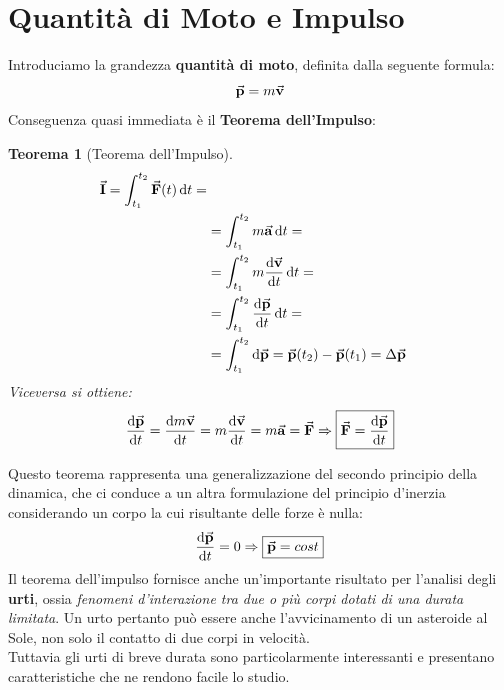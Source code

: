 \documentclass{report}
\newtheorem{thm}{Teorema}[section]
\newcommand{\then}{\ensuremath{\Rightarrow}}
\renewcommand{\a}{\va{a}}
\renewcommand{\v}{\va{v}}
\newcommand{\F}{\va{F}}
\newcommand{\p}{\va{p}}
\begin{document}
\section{Quantità di Moto e Impulso}
Introduciamo la grandezza \textbf{quantità di moto}, definita dalla seguente formula:
\begin{equation}
    \p=m\v
\end{equation}
Conseguenza quasi immediata è il \textbf{Teorema dell'Impulso}:
\begin{thm}[Teorema dell'Impulso]
\begin{equation}
\begin{split}
    \va{I}=\int_{t_1}^{t_2}\F(t)\dif t=\\
    &=\int_{t_1}^{t_2}m\a\dif t=\\
    &=\int_{t_1}^{t_2}m\dv{\v}{t}\dif t=\\
    &=\int_{t_1}^{t_2}\dv{\p}{t}\dif t=\\
    &=\int_{t_1}^{t_2}\dif\p=\p(t_2)-\p(t_1)=\Delta\p
\end{split}
\end{equation}
Viceversa si ottiene:
\begin{equation}
    \dv{\p}{t}=\dv{m\v}{t}=m\dv{\v}{t}=m\a=\F\then \boxed{\F=\dv{\p}{t}}
\end{equation}
\end{thm}
Questo teorema rappresenta una generalizzazione del secondo principio della dinamica, che ci conduce a un altra formulazione del principio d'inerzia considerando un corpo la cui risultante delle forze è nulla:
\begin{equation}
    \dv{\p}{t}=0\then\boxed{\p=cost}
\end{equation}
Il teorema dell'impulso fornisce anche un'importante risultato per l'analisi degli \textbf{urti}, ossia \textit{fenomeni d'interazione tra due o più corpi dotati di una durata limitata}. Un urto pertanto può essere anche l'avvicinamento di un asteroide al Sole, non solo il contatto di due corpi in velocità.\\
Tuttavia gli urti di breve durata sono particolarmente interessanti e presentano caratteristiche che ne rendono facile lo studio. 
\end{document}
